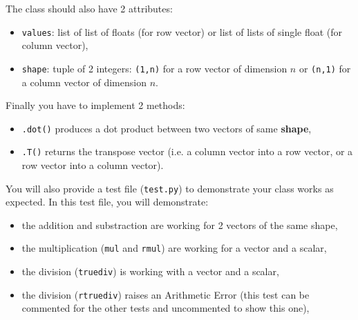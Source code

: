 \documentclass{42-en}
\begin{document}
The class should also have 2 attributes:
\begin{itemize}
  \item \texttt{values}: list of list of floats (for row vector) or list of lists of single float (for column vector),
  \item \texttt{shape}: tuple of 2 integers: \texttt{(1,n)} for a row vector of dimension $n$
  or \texttt{(n,1)} for a column vector of dimension $n$. 
\end{itemize}

      
Finally you have to implement 2 methods: 
\begin{itemize}
  \item \texttt{.dot()} produces a dot product between two vectors of same \textbf{shape},
  \item \texttt{.T()} returns the transpose vector (i.e. a column vector into a row vector, or a row vector into a column vector).
\end{itemize}

You will also provide a test file (\texttt{test.py}) to demonstrate your class
works as expected. In this test file, you will demonstrate:
\begin{itemize}
  \item the addition and substraction are working for 2 vectors of the same shape,
  \item the multiplication (\texttt{mul} and \texttt{rmul}) are working for a vector and a scalar,
  \item the division (\texttt{truediv}) is working with a vector and a scalar,
  \item the division (\texttt{rtruediv}) raises an Arithmetic Error (this test can be commented for the other tests and uncommented to show this one),
\end{itemize}

\end{document}
